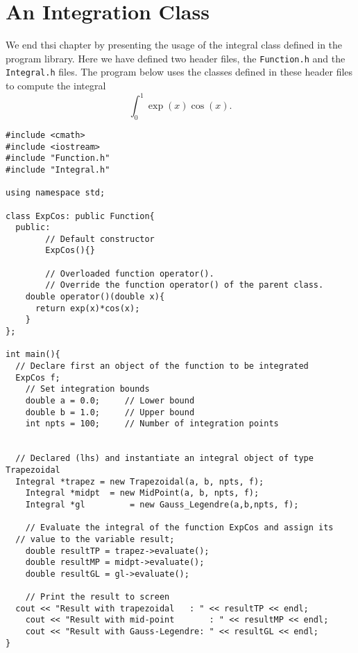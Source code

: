 \section{An Integration Class}
We end thsi chapter by presenting the usage of the integral class defined in the
program library. Here we have defined two header files, the \lstinline{Function.h}
and the \lstinline{Integral.h} files. The program below uses the classes defined in
these header files  to compute the  integral 
\[
\int_0^1 \exp{(x)}\cos{(x)}.
\]
\begin{lstlisting}
#include <cmath>
#include <iostream>
#include "Function.h"
#include "Integral.h"

using namespace std;

class ExpCos: public Function{
  public:
		// Default constructor
		ExpCos(){}
		
		// Overloaded function operator().
		// Override the function operator() of the parent class.
    double operator()(double x){
      return exp(x)*cos(x);
    }
};

int main(){
  // Declare first an object of the function to be integrated
  ExpCos f;
	// Set integration bounds
	double a = 0.0; 	// Lower bound
	double b = 1.0;		// Upper bound
	int npts = 100;		// Number of integration points
	
  
  // Declared (lhs) and instantiate an integral object of type Trapezoidal
  Integral *trapez = new Trapezoidal(a, b, npts, f);
	Integral *midpt  = new MidPoint(a, b, npts, f);
	Integral *gl		 = new Gauss_Legendre(a,b,npts, f);
	
	// Evaluate the integral of the function ExpCos and assign its 
  // value to the variable result;
	double resultTP = trapez->evaluate();
	double resultMP	= midpt->evaluate();
	double resultGL = gl->evaluate();
	
	// Print the result to screen
  cout << "Result with trapezoidal	 : " << resultTP << endl;
	cout << "Result with mid-point  	 : " << resultMP << endl;
	cout << "Result with Gauss-Legendre: " << resultGL << endl;
}
\end{lstlisting}

